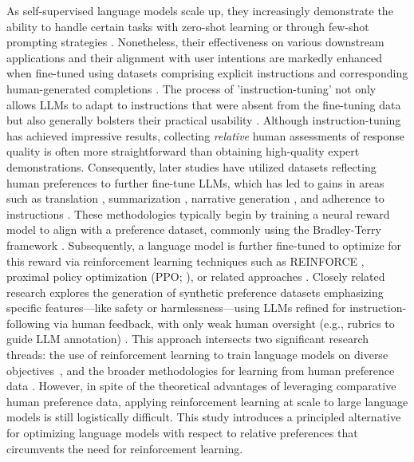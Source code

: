 As self-supervised language models scale up, they increasingly demonstrate the ability to handle certain tasks with zero-shot learning \citep{radford2019language} or through few-shot prompting strategies \citep{gpt3,megatron,chowdhery2022palm}. Nonetheless, their effectiveness on various downstream applications and their alignment with user intentions are markedly enhanced when fine-tuned using datasets comprising explicit instructions and corresponding human-generated completions \citep{mishra-etal-2022-cross,sanh2022multitask,chung2022scaling,thoppilan2022lamda}. The process of 'instruction-tuning' not only allows LLMs to adapt to instructions that were absent from the fine-tuning data but also generally bolsters their practical usability \citep{chung2022scaling}. Although instruction-tuning has achieved impressive results, collecting \textit{relative} human assessments of response quality is often more straightforward than obtaining high-quality expert demonstrations. Consequently, later studies have utilized datasets reflecting human preferences to further fine-tune LLMs, which has led to gains in areas such as translation \citep{kreutzer-etal-2018-reliability}, summarization \citep{stiennon2022learning,ziegler2020finetuning}, narrative generation \citep{ziegler2020finetuning}, and adherence to instructions \citep{ouyang2022training,ramamurthy2023is}. These methodologies typically begin by training a neural reward model to align with a preference dataset, commonly using the Bradley-Terry framework \citep{bradley1952rankanalysis}. Subsequently, a language model is further fine-tuned to optimize for this reward via reinforcement learning techniques such as REINFORCE \citep{williams1992reinforce}, proximal policy optimization (PPO; \cite{schulman2017proximal}), or related approaches \citep{ramamurthy2023is}. Closely related research explores the generation of synthetic preference datasets emphasizing specific features—like safety or harmlessness—using LLMs refined for instruction-following via human feedback, with only weak human oversight (e.g., rubrics to guide LLM annotation) \citep{bai2022constitutional}. This approach intersects two significant research threads: the use of reinforcement learning to train language models on diverse objectives~\citep{Ranzato2015SequenceLT,paulus2018a,wu2018learning}, and the broader methodologies for learning from human preference data \citep{christiano2017deep,kupcsik2018learning}. However, in spite of the theoretical advantages of leveraging comparative human preference data, applying reinforcement learning at scale to large language models is still logistically difficult. This study introduces a principled alternative for optimizing language models with respect to relative preferences that circumvents the need for reinforcement learning.

